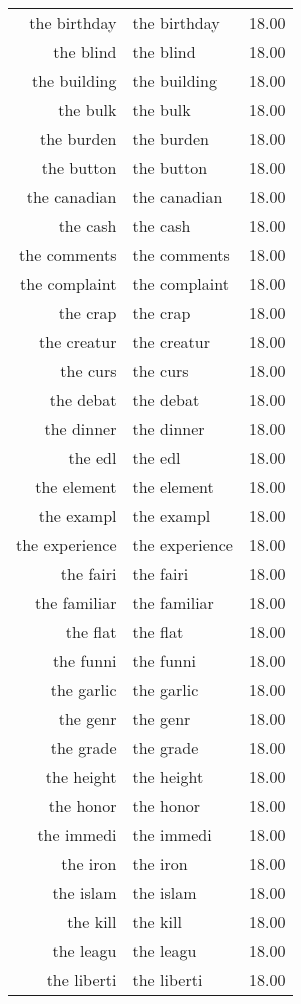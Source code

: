 \begin{table}[ht]
\begin{tabular}{rlr}
  the birthday & the birthday & 18.00 \\ 
  the blind & the blind & 18.00 \\ 
  the building & the building & 18.00 \\ 
  the bulk & the bulk & 18.00 \\ 
  the burden & the burden & 18.00 \\ 
  the button & the button & 18.00 \\ 
  the canadian & the canadian & 18.00 \\ 
  the cash & the cash & 18.00 \\ 
  the comments & the comments & 18.00 \\ 
  the complaint & the complaint & 18.00 \\ 
  the crap & the crap & 18.00 \\ 
  the creatur & the creatur & 18.00 \\ 
  the curs & the curs & 18.00 \\ 
  the debat & the debat & 18.00 \\ 
  the dinner & the dinner & 18.00 \\ 
  the edl & the edl & 18.00 \\ 
  the element & the element & 18.00 \\ 
  the exampl & the exampl & 18.00 \\ 
  the experience & the experience & 18.00 \\ 
  the fairi & the fairi & 18.00 \\ 
  the familiar & the familiar & 18.00 \\ 
  the flat & the flat & 18.00 \\ 
  the funni & the funni & 18.00 \\ 
  the garlic & the garlic & 18.00 \\ 
  the genr & the genr & 18.00 \\ 
  the grade & the grade & 18.00 \\ 
  the height & the height & 18.00 \\ 
  the honor & the honor & 18.00 \\ 
  the immedi & the immedi & 18.00 \\ 
  the iron & the iron & 18.00 \\ 
  the islam & the islam & 18.00 \\ 
  the kill & the kill & 18.00 \\ 
  the leagu & the leagu & 18.00 \\ 
  the liberti & the liberti & 18.00 \\ 

\end{tabular}
\end{table}
